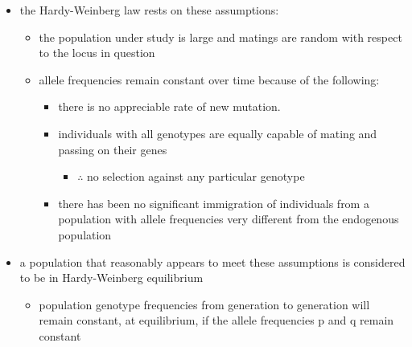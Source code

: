 \documentclass[12pt]{scrartcl}
\begin{document}
\begin{itemize}
\item the Hardy-Weinberg law rests on these assumptions:
\begin{itemize}
\item the population under study is large and matings are random with
respect to the locus in question
\item allele frequencies remain constant over time because of the
following:
\begin{itemize}
\item there is no appreciable rate of new mutation.
\item individuals with all genotypes are equally capable of mating and
passing on their genes
\begin{itemize}
\item \(\therefore\) no selection against	any particular genotype
\end{itemize}
\item there has been no significant immigration of individuals from a
population with allele frequencies very different from the
endogenous population
\end{itemize}
\end{itemize}
\item a population that reasonably appears to meet these assumptions is
considered to be in Hardy-Weinberg equilibrium
\begin{itemize}
\item population genotype frequencies from generation to generation
will remain constant, at equilibrium, if the allele frequencies p
and q remain constant
\end{itemize}
\end{itemize}
\end{document}
